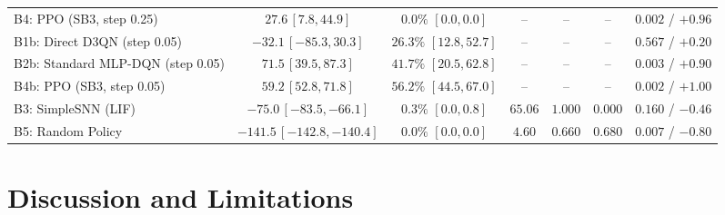 \documentclass[journal]{IEEEtran}
\begin{document}
\begin{table}[t]
{\begin{tabular}{@{}lcccccc@{}}
B4: PPO (SB3, step 0.25) & $27.6\,[7.8, 44.9]$ & $0.0\%$ $[0.0, 0.0]$ & -- & -- & -- & $0.002$ / $+0.96$ \\
B1b: Direct D3QN (step 0.05) & $-32.1\,[-85.3, 30.3]$ & $26.3\%$ $[12.8, 52.7]$ & -- & -- & -- & $0.567$ / $+0.20$ \\
B2b: Standard MLP-DQN (step 0.05) & $71.5\,[39.5, 87.3]$ & $41.7\%$ $[20.5, 62.8]$ & -- & -- & -- & $0.003$ / $+0.90$ \\
B4b: PPO (SB3, step 0.05) & $59.2\,[52.8, 71.8]$ & $56.2\%$ $[44.5, 67.0]$ & -- & -- & -- & $0.002$ / $+1.00$ \\
B3: SimpleSNN (LIF) & $-75.0\,[-83.5, -66.1]$ & $0.3\%$ $[0.0, 0.8]$ & $65.06$ & $1.000$ & $0.000$ & $0.160$ / $-0.46$ \\
B5: Random Policy & $-141.5\,[-142.8, -140.4]$ & $0.0\%$ $[0.0, 0.0]$ & $4.60$ & $0.660$ & $0.680$ & $0.007$ / $-0.80$ \\
\bottomrule
\end{tabular}%
}
\end{table}

\section{Discussion and Limitations}
\label{sec:discussion}
\end{document}
